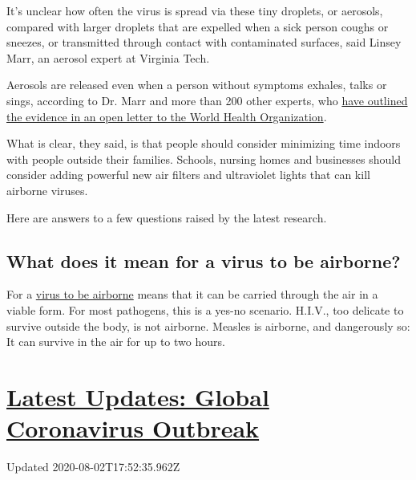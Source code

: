 It's unclear how often the virus is spread via these tiny droplets, or
aerosols, compared with larger droplets that are expelled when a sick
person coughs or sneezes, or transmitted through contact with
contaminated surfaces, said Linsey Marr, an aerosol expert at Virginia
Tech.

Aerosols are released even when a person without symptoms exhales, talks
or sings, according to Dr. Marr and more than 200 other experts, who
\href{https://academic.oup.com/cid/article/doi/10.1093/cid/ciaa939/5867798}{have
outlined the evidence in an open letter to the World Health
Organization}.

What is clear, they said, is that people should consider minimizing time
indoors with people outside their families. Schools, nursing homes and
businesses should consider adding powerful new air filters and
ultraviolet lights that can kill airborne viruses.

Here are answers to a few questions raised by the latest research.

\hypertarget{what-does-it-mean-for-a-virus-to-be-airborne}{%
\subsection{What does it mean for a virus to be
airborne?}\label{what-does-it-mean-for-a-virus-to-be-airborne}}

For a
\href{https://www.nytimes3xbfgragh.onion/2020/07/09/health/virus-aerosols-who.html}{virus
to be airborne} means that it can be carried through the air in a viable
form. For most pathogens, this is a yes-no scenario. H.I.V., too
delicate to survive outside the body, is not airborne. Measles is
airborne, and dangerously so: It can survive in the air for up to two
hours.

\hypertarget{latest-updates-global-coronavirus-outbreak}{%
\section{\texorpdfstring{\href{https://www.nytimes3xbfgragh.onion/2020/08/01/world/coronavirus-covid-19.html?action=click\&pgtype=Article\&state=default\&region=MAIN_CONTENT_1\&context=storylines_live_updates}{Latest
Updates: Global Coronavirus
Outbreak}}{Latest Updates: Global Coronavirus Outbreak}}\label{latest-updates-global-coronavirus-outbreak}}

Updated 2020-08-02T17:52:35.962Z

